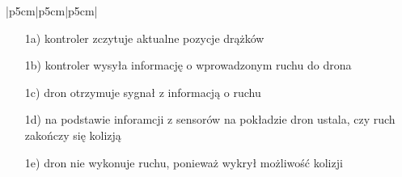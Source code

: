 \documentclass[12pt]{article}
\begin{document}
\begin{table}[h]
\begin{tabular}{|p{5cm}|p{5cm}|p{5cm}|}
{\begin{minipage}[t]{0.6\linewidth}
    \begin{enumerate}
        \item[1a)] kontroler zczytuje aktualne pozycje drążków
        \item[1b)] kontroler wysyła informację o wprowadzonym ruchu do drona
        \item[1c)] dron otrzymuje sygnał z informacją o ruchu
        \item[1d)] na podstawie inforamcji z sensorów na pokładzie dron ustala, czy ruch zakończy się kolizją
        \item[1e)] dron nie wykonuje ruchu, ponieważ wykrył możliwość kolizji
        \newline
    \end{enumerate}
\end{minipage}}\\
\hline
{}\\
\hline
\end{tabular}
\caption{Przypadek użycia: Wykonanie ruchu}
\label{tab:tabela_pu}
\end{table}
\end{document}
